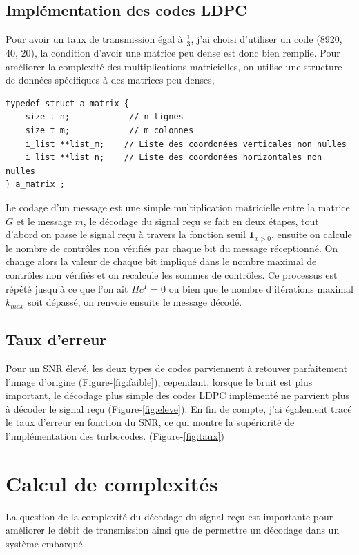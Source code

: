 \documentclass[12pt]{article}
\begin{document}
\subsection{Impl\'ementation des codes LDPC}
Pour avoir un taux de transmission \'egal \`a $\frac{1}{3}$, j'ai choisi d'utiliser un code (8920, 40, 20), la condition d'avoir une matrice peu dense est donc bien remplie.
Pour am\'eliorer la complexit\'e des multiplications matricielles, on utilise une structure de donn\'ees sp\'ecifiques \`a des matrices peu denses,
\footnotesize
\begin{verbatim}
typedef struct a_matrix {
	size_t n;            // n lignes
	size_t m;            // m colonnes
	i_list **list_m;    // Liste des coordonées verticales non nulles
	i_list **list_n;    // Liste des coordonées horizontales non nulles
} a_matrix ;
\end{verbatim}
\normalsize
Le codage d'un message est une simple multiplication matricielle entre la matrice $G$ et le message $m$, le d\'ecodage du signal re\c{c}u se fait en deux \'etapes, tout d'abord on passe le signal re\c{c}u \`a travers la fonction seuil $\mathbf{1}_{x>0}$, ensuite on calcule le nombre de contr\^oles non v\'erifi\'es par chaque bit du message r\'eceptionn\'e. On change alors la valeur de chaque bit impliqu\'e dans le nombre maximal de contr\^oles non v\'erifi\'es et on recalcule les sommes de contr\^oles. Ce processus est r\'ep\'et\'e jusqu'\`a ce que l'on ait $Hc^T=0$ ou bien que le nombre d'it\'erations maximal $k_{max}$ soit d\'epass\'e, on renvoie ensuite le message d\'ecod\'e.


\subsection{Taux d'erreur}
Pour un SNR \'elev\'e, les deux types de codes parviennent \`a retouver parfaitement l'image d'origine (Figure-\ref{fig:faible}), cependant, lorsque le bruit est plus important, le d\'ecodage plus simple des codes LDPC impl\'ement\'e ne parvient plus \`a d\'ecoder le signal re\c{c}u (Figure-\ref{fig:eleve}). En fin de compte, j'ai \'egalement trac\'e le taux d'erreur en fonction du SNR, ce qui montre la sup\'eriorit\'e de l'impl\'ementation des turbocodes. (Figure-\ref{fig:taux})


\section{Calcul de complexit\'es}
La question de la complexit\'e du d\'ecodage du signal re\c{c}u est importante pour am\'eliorer le d\'ebit de transmission ainsi que de permettre un d\'ecodage dans un syst\`eme
embarqu\'e.
\end{document}
